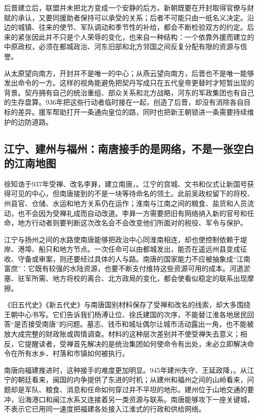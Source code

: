 后晋建立后，联盟并未把北方变成一个安静的后方。新朝既要在开封取得官僚与财赋的承认，又要同援助者保持可以承受的关系；后者不可能只由一纸名义决定。沿边的城镇、往来的使节、军队调动和季节性的补给，都会不断检验双方的约定。后来的紧张因此并不只是个人荣辱的变化，也来自一种结构：一个依靠外援而建立的中原政权，必须在都城政治、河东旧部和北方邻国之间反复分配有限的资源与信誉。

从太原望向南方，开封并不是唯一的中心；从燕云望向南方，后晋也不是唯一能够发出命令的一方。这样的视角能避免把契丹写成只在五代皇帝更替时才短暂出现的背景。契丹拥有自己的统治重组、部众关系和北方战略，河东的军政集团也有自己的生存盘算。936年把这些行动者临时接在一起，创造了后晋，却没有消除各自目标的差异。援军帮助打开一条通向皇位的路，同时也把新王朝锁进一条需要持续维护的边防道路。

\subsection{江宁、建州与福州：南唐接手的是网络，不是一张空白的江南地图}

徐知诰于937年受禅、改名李昪，建立南唐，。江宁的宫城、文书和仪式让新国号获得可见的中心，但南唐接到的不是一块等待命名的领土。此前吴政权留下的将校、州县官、仓储、水运和地方关系仍在运作；淮南与江南之间的粮食、盐货和人员流动，也不会因为受禅礼成而自动改道。李昪一方需要把旧有网络纳入新的官号和任命，地方行动者则要判断这次改名会不会改变他们所面对的税役、军令与保护。

江宁与扬州之间的水路使南唐能够把政治中心同淮南相连，却也使控制依赖于堤岸、港埠、船只和地方节点。一次任命可以由都城发出，能否在遥远州县变成征收、守备或审案，则还要经过具体的人与路。南唐的国家能力不应被抽象成“江南富庶”：它既有较强的水陆资源，也要不断支付维持这些资源可用的成本。河道淤塞、驻军所需、地方将校的离合、北方政局的变化，都会使看似稳定的联系出现摩擦。

《旧五代史》《新五代史》与南唐国别材料保存了受禅和改名的线索，却大多围绕王朝中心书写。它们告诉我们杨溥让位、徐氏建国的次序，不能替江淮各地居民回答“是否接受南唐”的问题。墓志、钱币和城址偶尔让城市活动露出一角，也不能被放大成完整的财政账或舆情调查。材料的这种层次差别并不使受禅失去意义；相反，它提醒读者，受禅首先解决的是统治集团如何使命令有出处，未必立即解决命令在所有水乡、村落和市镇如何被执行。

南唐向福建推进时，这种接手的难度更加明显。945年建州失守、王延政降，。从江宁的朝廷看来，闽国的内争提供了东进的时机；从建州和福州之间的山岭看来，问题却是军队、粮食、消息和任命如何穿过并不平坦的地形。建州位于山地交通的要冲，沿海港口和闽江水系又连接着另一类资源与联系。南唐能够攻下一座关键城，不表示它已用同一速度把福建各处接入江淮式的行政和供给网络。

